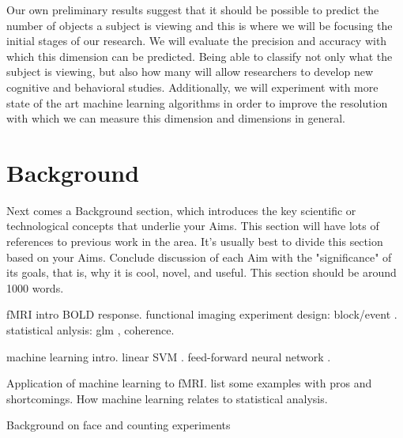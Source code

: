 \documentclass[12pt]{article}
\begin{document}
Our own preliminary results suggest that it should be possible to predict the number of objects a subject is viewing and this is where we will be focusing the initial stages of our research.
We will evaluate the precision and accuracy with which this dimension can be predicted.
Being able to classify not only what the subject is viewing, but also how many will allow researchers to develop new cognitive and behavioral studies. 
Additionally, we will experiment with more state of the art machine learning algorithms in order to improve the resolution with which we can measure this dimension and dimensions in general.

\section{Background}
Next comes a Background section, which introduces the key scientific or technological concepts that underlie your Aims. 
This section will have lots of references to previous work in the area. 
It's usually best to divide this section based on your Aims. 
Conclude discussion of each Aim with the "significance" of its goals, that is, why it is cool, novel, and useful. 
This section should be around 1000 words.

fMRI intro
BOLD response.
functional imaging experiment design: block/event \cite{Dale1997,Liu2001}.
statistical anlysis: glm \cite{Worsley1995,Beckmann2003}, coherence.

machine learning intro.
linear SVM \cite{Burges1998}.
feed-forward neural network \cite{Hecht-nielsen1989,Jain1996}.

Application of machine learning to fMRI.
list some examples \cite{Haxby2001,Mitchell2003,Haynes2006} with pros and shortcomings.
How machine learning relates to statistical analysis.

Background on face \cite{McCarthy1997,Haxby2001} and counting \cite{Bush1998} \cite{Rickard2000} \cite{Eliez2001} \cite{Mostofsky2003} experiments
\end{document}
